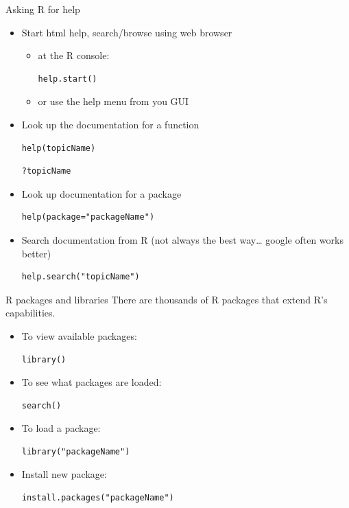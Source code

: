 \documentclass[table,smaller]{beamer}
\begin{document}
\begin{frame}[fragile,label=sec-2-6]{Asking R for help}
 \begin{itemize}
\item Start html help, search/browse using web browser
\begin{itemize}
\item at the R console:
\begin{verbatim}
help.start()
\end{verbatim}

\item or use the help menu from you GUI
\end{itemize}

\item Look up the documentation for a function
\begin{verbatim}
help(topicName)
\end{verbatim}

\begin{verbatim}
?topicName
\end{verbatim}

\item Look up documentation for a package
\begin{verbatim}
help(package="packageName")
\end{verbatim}

\item Search documentation from R (not always the best way\ldots{} google often works better)
\begin{verbatim}
help.search("topicName")
\end{verbatim}
\end{itemize}
\end{frame}
\begin{frame}[fragile,label=sec-2-7]{R packages and libraries}
 There are thousands of R packages that extend R's capabilities.

\begin{itemize}
\item To view available packages: 
\begin{verbatim}
library()
\end{verbatim}

\item To see what packages are loaded: 
\begin{verbatim}
search()
\end{verbatim}

\item To load a package: 
\begin{verbatim}
library("packageName")
\end{verbatim}

\item Install new package: 
\begin{verbatim}
install.packages("packageName")
\end{verbatim}
\end{itemize}
\end{frame}
\end{document}
